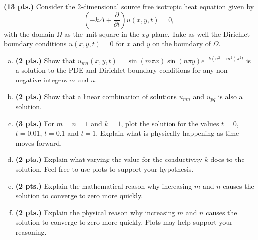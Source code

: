 \documentclass[12pt]{article} %
\begin{document}
\begin{problem}
    \textbf{(13 pts.)} Consider the 2-dimensional source free isotropic heat equation given by
    \[
    \left( -k \Delta + \frac{\partial}{\partial t} \right) u(x,y,t) = 0,
    \]
    with the domain $\Omega$ as the unit square in the $xy$-plane. Take as well the Dirichlet boundary conditions $u(x,y,t)=0$ for $x$ and $y$ on the boundary of $\Omega$.
    \begin{enumerate}[(a)]
        \item \textbf{(2 pts.)} Show that $u_{mn}(x,y,t)=\sin(m\pi x)\sin(n\pi y)e^{-k(n^2+m^2)\pi^2 t}$ is a solution to the PDE and Dirichlet boundary conditions for any non-negative integers $m$ and $n$.
        \item \textbf{(2 pts.)} Show that a linear combination of solutions $u_{mn}$ and $u_{pq}$ is also a solution.
        \item \textbf{(3 pts.)} For $m=n=1$ and $k=1$, plot the solution for the values $t=0$, $t=0.01$, $t=0.1$ and $t=1$.  Explain what is physically happening as time moves forward.
        \item \textbf{(2 pts.)} Explain what varying the value for the conductivity $k$ does to the solution.  Feel free to use plots to support your hypothesis.
        \item \textbf{(2 pts.)} Explain the mathematical reason why increasing $m$ and $n$ causes the solution to converge to zero more quickly.
        \item \textbf{(2 pts.)} Explain the physical reason why increasing $m$ and $n$ causes the solution to converge to zero more quickly. Plots may help support your reasoning.
    \end{enumerate}
\end{problem}
\end{document}

